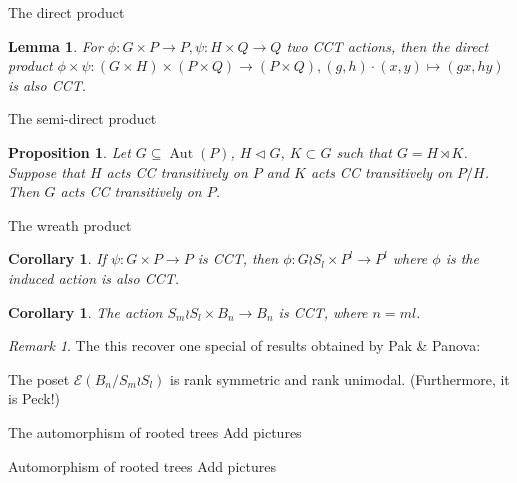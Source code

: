 \documentclass{beamer}
\newtheorem{cor}[thm]{Corollary}
\newtheorem{lem}[thm]{Lemma}
\newtheorem{prop}[thm]{Proposition}
\theoremstyle{remark}
\newtheorem{rem}[thm]{Remark}
\begin{document}
\begin{frame}{The direct product}
\begin{lem}
\label{thm:direct_product_preservation}
For $\phi:G\times P\rightarrow P,\psi:H \times Q \rightarrow Q$ two CCT actions, then the direct product $\phi \times \psi:(G\times H)\times (P\times Q) \rightarrow (P\times Q),(g,h)\cdot (x,y) \mapsto (gx,hy)$ is also CCT.
\end{lem}
\end{frame}





\begin{frame}{The semi-direct product}
\begin{prop}\label{prop:semidirect_product_cover_transitive_actions}
Let $G\subseteq \operatorname{Aut}(P)$, $H\triangleleft G$, $K\subset G$ such that $G = H\rtimes K$.  Suppose that $H$ acts CC transitively on $P$ and $K$ acts CC transitively on $P/H$.  Then $G$ acts CC transitively on $P$.
\end{prop}
\end{frame}





\begin{frame}{The wreath product}
\begin{cor}
\label{thm:wreath_preservation}
If $\psi:G\times P \rightarrow P$ is CCT, then $\phi:G\wr S_l \times P^l \rightarrow P^l$ where $\phi$ is the induced action is also CCT.
\end{cor}
\pause
\begin{cor}
The action $S_m \wr S_l \times B_{n} \rightarrow B_{n}$ is CCT, where $n =ml$.
\end{cor}
\pause
\begin{rem}
The this recover one special of results obtained by Pak \& Panova: 

The poset $\mathcal E (B_n/S_m \wr S_l)$ is rank symmetric and rank unimodal. (Furthermore, it is Peck!)
\end{rem}
\end{frame}





\begin{frame}{The automorphism of rooted trees}
Add pictures
\end{frame}





\begin{frame}{Automorphism of rooted trees}
Add pictures
\end{frame}
\end{document}
